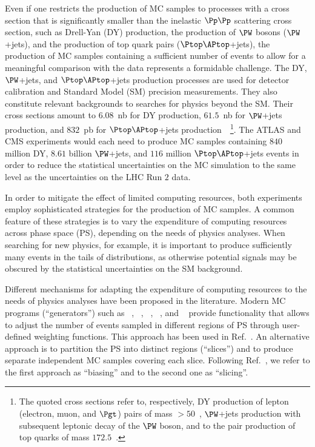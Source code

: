 Even if one restricts the production of MC samples to processes with a cross section that is significantly smaller than the inelastic $\Pp\Pp$ scattering cross section,
such as Drell-Yan (DY) production, the production of $\PW$ bosons ($\PW$+jets), and the production of top quark pairs ($\Ptop\APtop$+jets),
the production of MC samples containing a sufficient number of events to allow for a meaningful comparison with the data represents a formidable challenge.
The DY, $\PW$+jets, and $\Ptop\APtop$+jets production processes are used for detector calibration and Standard Model (SM) precision measurements.
They also constitute relevant backgrounds to searches for physics beyond the SM.
Their cross sections amount to $6.08$~nb for DY production, $61.5$~nb for $\PW$+jets production,
and $832$~pb for $\Ptop\APtop$+jets production~\cite{Melnikov:2006kv,Li:2012wna,Czakon:2011xx}~\footnote{
  The quoted cross sections refer to, respectively, DY production of lepton (electron, muon, and $\Pgt$) pairs of mass $> 50$~\GeV,
  $\PW$+jets production with subsequent leptonic decay of the $\PW$ boson,
  and to the pair production of top quarks of mass $172.5$~\GeV.
}.
The ATLAS and CMS experiments would each need to produce MC samples containing $840$ million DY, $8.61$ billion $\PW$+jets, and $116$ million $\Ptop\APtop$+jets events
in order to reduce the statistical uncertainties on the MC simulation to the same level as the uncertainties on the LHC Run $2$ data.

In order to mitigate the effect of limited computing resources, both experiments employ sophisticated strategies for the production of MC samples.
A common feature of these strategies is to vary the expenditure of computing resources across phase space (PS),
depending on the needs of physics analyses.
When searching for new physics, for example, it is important to produce sufficiently many events in the tails of distributions,
as otherwise potential signals may be obscured by the statistical uncertainties on the SM background.

Different mechanisms for adapting the expenditure of computing resources to the needs of physics analyses have been proposed in the literature.
Modern MC programs (``generators'') such as \POWHEG~\cite{POWHEG1,POWHEG2,POWHEG3}, \MGvATNLO~\cite{MGvATNLO}, \SHERPA~\cite{SHERPA}, \PYTHIA~\cite{PYTHIA}, and \HERWIG~\cite{HERWIG}
provide functionality that allows to adjust the number of events sampled in different regions of PS through user-defined weighting functions.
This approach has been used in Ref.~\cite{ATLAS:2021yza}.
An alternative approach is to partition the PS into distinct regions (``slices'') and to produce separate independent MC samples covering each slice.
Following Ref.~\cite{HSFPhysicsEventGeneratorWG:2020gxw}, we refer to the first approach as ``biasing'' and to the second one as ``slicing''.

